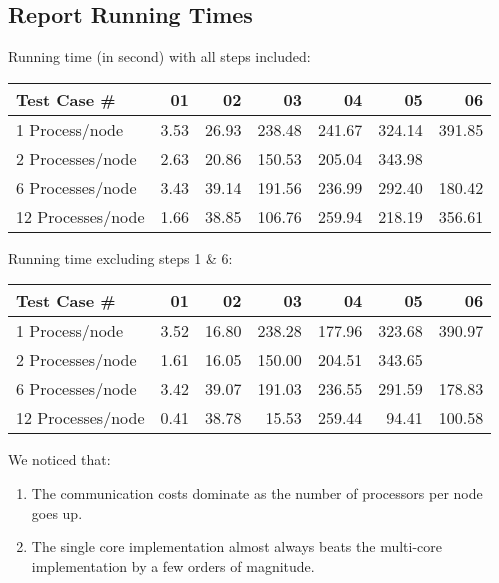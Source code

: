 \documentclass{article}
\begin{document}
\subsection{Report Running Times}

Running time (in second) with all steps included:

\begin{center}
  \begin{tabular}{| l | r | r | r | r | r | r |}
    \hline
    Test Case \# & 01 & 02 & 03 & 04 & 05 & 06  \\ \hline
    1 Process/node & 3.53 & 26.93 & 238.48 & 241.67 & 324.14 & 391.85 \\ \hline
    2 Processes/node & 2.63 & 20.86 & 150.53 & 205.04 & 343.98 &  \\ \hline
    6 Processes/node & 3.43 & 39.14 & 191.56 & 236.99 & 292.40 & 180.42 \\ \hline
    12 Processes/node & 1.66 & 38.85 & 106.76 & 259.94 & 218.19 & 356.61 \\ \hline
  \end{tabular}
\end{center}


Running time excluding steps 1 \& 6:

\begin{center}
  \begin{tabular}{| l | r | r | r | r | r | r |}
    \hline
    Test Case \# & 01 & 02 & 03 & 04 & 05 & 06  \\ \hline
    1 Process/node & 3.52 & 16.80 & 238.28 & 177.96 & 323.68 & 390.97 \\ \hline
    2 Processes/node & 1.61 & 16.05 & 150.00 & 204.51 & 343.65 &  \\ \hline
    6 Processes/node & 3.42 & 39.07 & 191.03 & 236.55 & 291.59 & 178.83 \\ \hline
    12 Processes/node & 0.41 & 38.78 & 15.53 & 259.44 & 94.41 & 100.58 \\ \hline
  \end{tabular}
\end{center}

We noticed that:

\begin{enumerate}

\item The communication costs dominate as the number of processors per
  node goes up.

\item The single core implementation almost always beats the
  multi-core implementation by a few orders of magnitude.

\end{enumerate}
\end{document}

